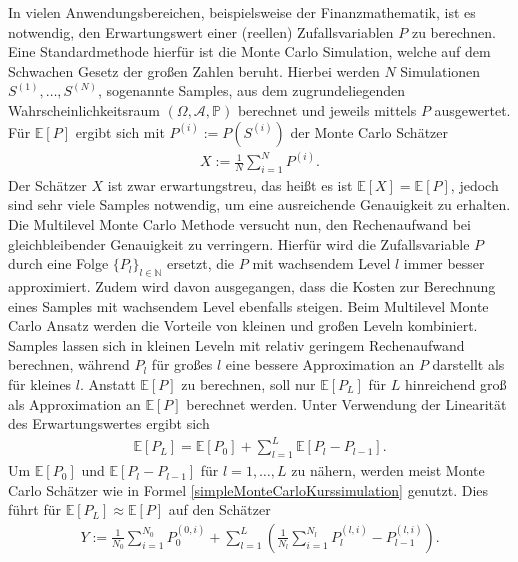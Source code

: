 \documentclass[10pt,a4paper]{article}
\begin{document}
In vielen Anwendungsbereichen, beispielsweise der Finanzmathematik, ist es notwendig, den Erwartungswert einer (reellen) Zufallsvariablen $P$ zu berechnen. Eine Standardmethode hierfür ist die Monte Carlo Simulation, welche auf dem Schwachen Gesetz der großen Zahlen beruht. Hierbei werden $N$ Simulationen $S^{(1)},\dots,S^{(N)}$, sogenannte Samples, aus dem zugrundeliegenden Wahrscheinlichkeitsraum $(\Omega,\mathcal{A},\mathbb{P})$ berechnet und jeweils mittels $P$ ausgewertet. Für $\mathbb{E}[P]$ ergibt sich mit $P^{(i)}:=P(S^{(i)})$ der Monte Carlo Schätzer
\begin{align}
	X:=\frac{1}{N}\sum\limits_{i=1}^{N}P^{(i)}. \label{simpleMonteCarloKurssimulation}
\end{align}
Der Schätzer $X$ ist zwar erwartungstreu, das heißt es ist $\mathbb{E}[X]=\mathbb{E}[P]$, jedoch sind sehr viele Samples notwendig, um eine ausreichende Genauigkeit zu erhalten.
\newline
Die Multilevel Monte Carlo Methode versucht nun, den Rechenaufwand bei gleichbleibender Genauigkeit zu verringern. Hierfür wird die Zufallsvariable $P$ durch eine Folge $\{P_l\}_{l\in\mathbb{N}}$ ersetzt, die $P$ mit wachsendem Level $l$ immer besser approximiert. Zudem wird davon ausgegangen, dass die Kosten zur Berechnung eines Samples mit wachsendem Level ebenfalls steigen. Beim Multilevel Monte Carlo Ansatz werden die Vorteile von kleinen und großen Leveln kombiniert. Samples lassen sich in kleinen Leveln mit relativ geringem Rechenaufwand berechnen, während $P_l$ für großes $l$ eine bessere Approximation an $P$ darstellt als für kleines $l$. Anstatt $\mathbb{E}[P]$ zu berechnen, soll nur $\mathbb{E}[P_L]$ für $L$ hinreichend groß als Approximation an $\mathbb{E}[P]$ berechnet werden. Unter Verwendung der Linearität des Erwartungswertes ergibt sich
\begin{align}
	\mathbb{E}[P_L]=\mathbb{E}[P_0]+\sum\limits_{l=1}^L \mathbb{E}[P_l-P_{l-1}]. \label{teleskopsummeMultilevelMonteCarloKurssimulation}
\end{align}
Um $\mathbb{E}[P_0]$ und $\mathbb{E}[P_l-P_{l-1}]$ für $l=1,\dots,L$ zu nähern, werden meist Monte Carlo Schätzer wie in Formel \eqref{simpleMonteCarloKurssimulation} genutzt. Dies führt für $\mathbb{E}[P_L]\approx\mathbb{E}[P]$ auf den Schätzer
\begin{align}
	Y:=\frac{1}{N_0}\sum\limits_{i=1}^{N_0}P_0^{(0,i)}+\sum\limits_{l=1}^L\left(\frac{1}{N_l}\sum\limits_{i=1}^{N_l}P_l^{(l,i)}-P_{l-1}^{(l,i)}\right). \label{teleskopsummeMultilevelMonteCarloKurssimulationMitSchaetzer}
\end{align}
\end{document}
